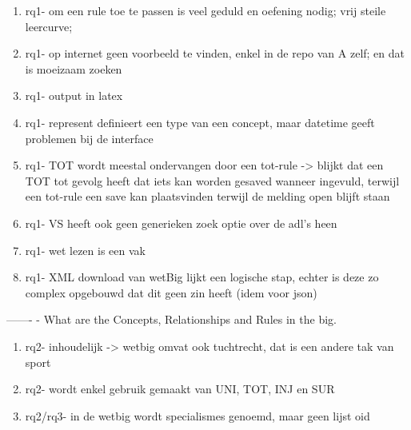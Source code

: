 \begin{enumerate}
    \item rq1- om een rule toe te passen is veel geduld en oefening nodig; vrij steile leercurve; 
    \item rq1- op internet geen voorbeeld te vinden, enkel in de repo van A zelf; en dat is moeizaam zoeken
    \item rq1- output in latex 
    \item rq1- represent definieert een type van een concept, maar datetime geeft problemen bij de interface
    \item rq1- TOT wordt meestal ondervangen door een tot-rule -> blijkt dat een TOT tot gevolg heeft dat iets kan worden gesaved wanneer ingevuld, terwijl een tot-rule een save kan plaatsvinden terwijl de melding open blijft staan
    \item rq1- VS heeft ook geen generieken zoek optie over de adl's heen
    \item rq1- wet lezen is een vak 
    \item rq1- XML download van wetBig lijkt een logische stap, echter is deze zo complex opgebouwd dat dit geen zin heeft (idem voor json)
\end{enumerate}
-------
\newline
[RQ2]- What are the Concepts, Relationships and Rules in the \acrshort{big}.
\begin{enumerate}
    \item rq2- inhoudelijk -> wetbig omvat ook tuchtrecht, dat is een andere tak van sport
    \item rq2- wordt enkel gebruik gemaakt van UNI, TOT, INJ en SUR
    \item rq2/rq3- in de wetbig wordt specialismes genoemd, maar geen lijst oid
\end{enumerate}

